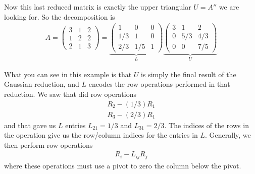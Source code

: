 Now this last reduced matrix is exactly the upper triangular $U=A''$ we are looking for. So the decomposition is
\begin{align*}
A = 
\begin{pmatrix}
3 & 1 & 2 \\
1 & 2 & 2 \\
2 & 1 & 3
\end{pmatrix}
=
\underbrace{
\begin{pmatrix}
1   & 0     & 0 \\
1/3 & 1     & 0 \\
2/3 & 1/5 & 1 
\end{pmatrix}}_{L}
\underbrace{
\begin{pmatrix}
3 & 1 & 2 \\
0 & 5/3 & 4/3 \\
0 & 0 & 7/5 
\end{pmatrix}}_{U}
\end{align*}

What you can see in this example is that $U$ is simply the final result of the Gaussian reduction, and $L$ encodes the row operations performed in that reduction. We saw that did row operations
\begin{align*}
R_2 - \left( 1/3 \right)R_1  \\
R_3 - \left( 2/3 \right)R_1
\end{align*}
and that gave us $L$ entries $L_{21}=1/3$ and $L_{31}=2/3$. The indices of the rows in the operation give us the row/column indices for the entries in $L$. Generally, we then perform row operations
\begin{align*}
R_i - L_{ij}R_j
\end{align*}
where these operations must use a pivot to zero the column below the pivot.


